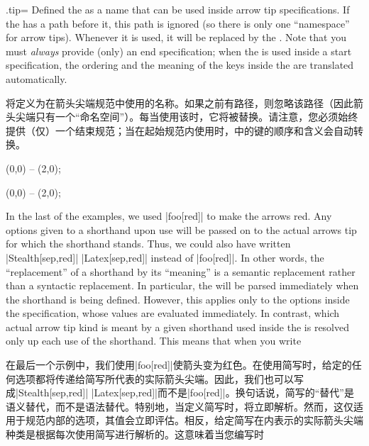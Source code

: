 \begin{handler}{{.tip}{=}}
    Defined the  as a name that can be used inside arrow tip
    specifications. If the  has a path before it, this path is
    ignored (so there is only one ``namespace'' for arrow tips). Whenever it is
    used, it will be replaced by the . Note that you
    must \emph{always} provide (only) an end specification; when the 
    is used inside a start specification, the ordering and the meaning of the
    keys inside the  are translated automatically.

    将定义为在箭头尖端规范中使用的名称。如果之前有路径，则忽略该路径（因此箭头尖端只有一个“命名空间”）。每当使用该时，它将被替换。请注意，您必须始终提供（仅）一个结束规范；当在起始规范内使用时，中的键的顺序和含义会自动转换。
\begin{codeexample}[preamble={\usetikzlibrary{arrows.meta}}]
\tikz [foo /.tip = {Stealth[sep]. >>}]
  \draw [-foo] (0,0) -- (2,0);
\end{codeexample}
\begin{codeexample}[preamble={\usetikzlibrary{arrows.meta}}]
\tikz [foo /.tip = {Stealth[sep] Latex[sep]},
       bar /.tip = {Stealth[length=10pt,open]}]
   (0,0) -- (2,0);
\end{codeexample}

    In the last of the examples, we used |foo[red]| to make the arrows red. Any
    options given to a shorthand upon use will be passed on to the actual
    arrows tip for which the shorthand stands. Thus, we could also have written
    |Stealth[sep,red]| |Latex[sep,red]| instead of |foo[red]|. In other words,
    the ``replacement'' of a shorthand by its ``meaning'' is a semantic
    replacement rather than a syntactic replacement. In particular, the
     will be parsed immediately when the shorthand is
    being defined. However, this applies only to the options inside the
    specification, whose values are evaluated immediately. In contrast, which
    actual arrow tip kind is meant by a given shorthand used inside the
     is resolved only up each use of the shorthand.
    This means that when you write
    
    在最后一个示例中，我们使用|foo[red]|使箭头变为红色。在使用简写时，给定的任何选项都将传递给简写所代表的实际箭头尖端。因此，我们也可以写成|Stealth[sep,red]| |Latex[sep,red]|而不是|foo[red]|。换句话说，简写的“替代”是语义替代，而不是语法替代。特别地，当定义简写时，将立即解析。然而，这仅适用于规范内部的选项，其值会立即评估。相反，给定简写在内表示的实际箭头尖端种类是根据每次使用简写进行解析的。这意味着当您编写时



\end{handler}
